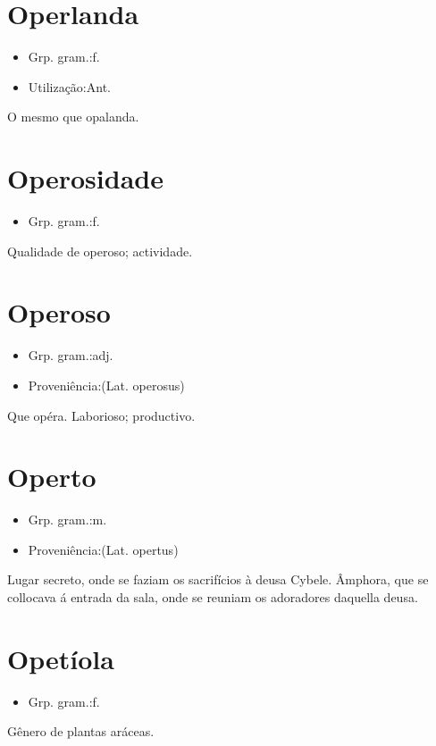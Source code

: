 \section{Operlanda}
\begin{itemize}
\item {Grp. gram.:f.}
\end{itemize}
\begin{itemize}
\item {Utilização:Ant.}
\end{itemize}
O mesmo que \textunderscore opalanda\textunderscore .
\section{Operosidade}
\begin{itemize}
\item {Grp. gram.:f.}
\end{itemize}
Qualidade de operoso; actividade.
\section{Operoso}
\begin{itemize}
\item {Grp. gram.:adj.}
\end{itemize}
\begin{itemize}
\item {Proveniência:(Lat. \textunderscore operosus\textunderscore )}
\end{itemize}
Que opéra.
Laborioso; productivo.
\section{Operto}
\begin{itemize}
\item {Grp. gram.:m.}
\end{itemize}
\begin{itemize}
\item {Proveniência:(Lat. \textunderscore opertus\textunderscore )}
\end{itemize}
Lugar secreto, onde se faziam os sacrifícios à deusa Cybele.
Âmphora, que se collocava á entrada da sala, onde se reuniam os adoradores daquella deusa.
\section{Opetíola}
\begin{itemize}
\item {Grp. gram.:f.}
\end{itemize}
Gênero de plantas aráceas.
